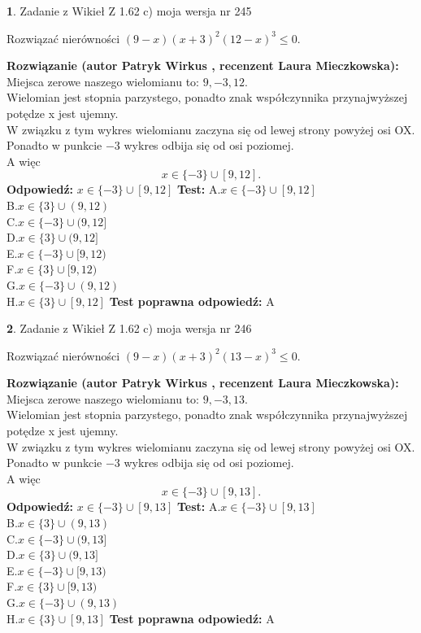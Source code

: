 \documentclass[12pt, a4paper]{article}
\theoremstyle{definition} %
\newtheorem{zad}{}
\newcommand{\zadStart}[1]{\begin{zad}#1\newline}
\newcommand{\zadStop}{\end{zad}}
\newcommand{\rozwStart}[2]{\noindent \textbf{Rozwiązanie (autor #1 , recenzent #2): }\newline}
\newcommand{\rozwStop}{\newline}
\newcommand{\odpStart}{\noindent \textbf{Odpowiedź:}\newline}
\newcommand{\odpStop}{\newline}
\newcommand{\testStart}{\noindent \textbf{Test:}\newline}
\newcommand{\testStop}{\newline}
\newcommand{\kluczStart}{\noindent \textbf{Test poprawna odpowiedź:}\newline}
\newcommand{\kluczStop}{\newline}
\begin{document}
\zadStart{Zadanie z Wikieł Z 1.62 c) moja wersja nr 245}

Rozwiązać nierówności $(9-x)(x+3)^{2}(12-x)^{3}\le0$.
\zadStop
\rozwStart{Patryk Wirkus}{Laura Mieczkowska}
Miejsca zerowe naszego wielomianu to: $9, -3, 12$.\\
Wielomian jest stopnia parzystego, ponadto znak współczynnika przy\linebreak najwyższej potędze x jest ujemny.\\ W związku z tym wykres wielomianu zaczyna się od lewej strony powyżej osi OX.\\
Ponadto w punkcie $-3$ wykres odbija się od osi poziomej.\\
A więc $$x \in \{-3\} \cup [9,12].$$
\rozwStop
\odpStart
$x \in \{-3\} \cup [9,12]$
\odpStop
\testStart
A.$x \in \{-3\} \cup [9,12]$\\
B.$x \in \{3\} \cup (9,12)$\\
C.$x \in \{-3\} \cup (9,12]$\\
D.$x \in \{3\} \cup (9,12]$\\
E.$x \in \{-3\} \cup [9,12)$\\
F.$x \in \{3\} \cup [9,12)$\\
G.$x \in \{-3\} \cup (9,12)$\\
H.$x \in \{3\} \cup [9,12]$
\testStop
\kluczStart
A
\kluczStop



\zadStart{Zadanie z Wikieł Z 1.62 c) moja wersja nr 246}

Rozwiązać nierówności $(9-x)(x+3)^{2}(13-x)^{3}\le0$.
\zadStop
\rozwStart{Patryk Wirkus}{Laura Mieczkowska}
Miejsca zerowe naszego wielomianu to: $9, -3, 13$.\\
Wielomian jest stopnia parzystego, ponadto znak współczynnika przy\linebreak najwyższej potędze x jest ujemny.\\ W związku z tym wykres wielomianu zaczyna się od lewej strony powyżej osi OX.\\
Ponadto w punkcie $-3$ wykres odbija się od osi poziomej.\\
A więc $$x \in \{-3\} \cup [9,13].$$
\rozwStop
\odpStart
$x \in \{-3\} \cup [9,13]$
\odpStop
\testStart
A.$x \in \{-3\} \cup [9,13]$\\
B.$x \in \{3\} \cup (9,13)$\\
C.$x \in \{-3\} \cup (9,13]$\\
D.$x \in \{3\} \cup (9,13]$\\
E.$x \in \{-3\} \cup [9,13)$\\
F.$x \in \{3\} \cup [9,13)$\\
G.$x \in \{-3\} \cup (9,13)$\\
H.$x \in \{3\} \cup [9,13]$
\testStop
\kluczStart
A
\kluczStop
\end{document}
